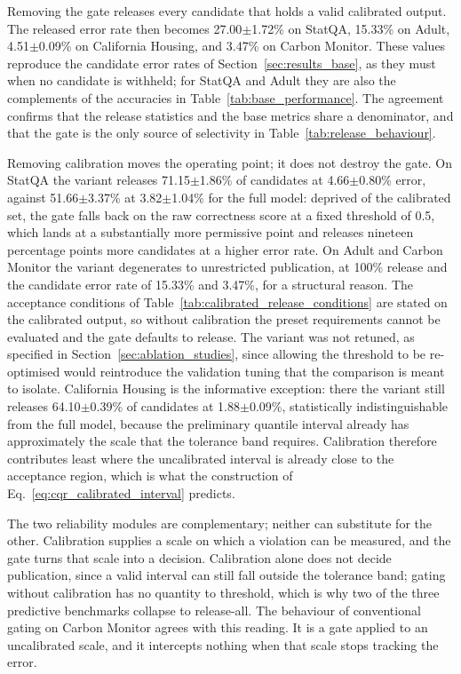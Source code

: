 \documentclass[preprint,12pt,authoryear]{elsarticle}
\begin{document}
Removing the gate releases every candidate that holds a valid calibrated output.
The released error rate then becomes 27.00$\pm$1.72\% on StatQA, 15.33\% on Adult, 4.51$\pm$0.09\% on California Housing, and 3.47\% on Carbon Monitor.
These values reproduce the candidate error rates of Section~\ref{sec:results_base}, as they must when no candidate is withheld; for StatQA and Adult they are also the complements of the accuracies in Table~\ref{tab:base_performance}.
The agreement confirms that the release statistics and the base metrics share a denominator, and that the gate is the only source of selectivity in Table~\ref{tab:release_behaviour}.

Removing calibration moves the operating point; it does not destroy the gate.
On StatQA the variant releases 71.15$\pm$1.86\% of candidates at 4.66$\pm$0.80\% error, against 51.66$\pm$3.37\% at 3.82$\pm$1.04\% for the full model: deprived of the calibrated set, the gate falls back on the raw correctness score at a fixed threshold of 0.5, which lands at a substantially more permissive point and releases nineteen percentage points more candidates at a higher error rate.
On Adult and Carbon Monitor the variant degenerates to unrestricted publication, at 100\% release and the candidate error rate of 15.33\% and 3.47\%, for a structural reason.
The acceptance conditions of Table~\ref{tab:calibrated_release_conditions} are stated on the calibrated output, so without calibration the preset requirements cannot be evaluated and the gate defaults to release.
The variant was not retuned, as specified in Section~\ref{sec:ablation_studies}, since allowing the threshold to be re-optimised would reintroduce the validation tuning that the comparison is meant to isolate.
California Housing is the informative exception: there the variant still releases 64.10$\pm$0.39\% of candidates at 1.88$\pm$0.09\%, statistically indistinguishable from the full model, because the preliminary quantile interval already has approximately the scale that the tolerance band requires.
Calibration therefore contributes least where the uncalibrated interval is already close to the acceptance region, which is what the construction of Eq.~\eqref{eq:cqr_calibrated_interval} predicts.

The two reliability modules are complementary; neither can substitute for the other.
Calibration supplies a scale on which a violation can be measured, and the gate turns that scale into a decision.
Calibration alone does not decide publication, since a valid interval can still fall outside the tolerance band; gating without calibration has no quantity to threshold, which is why two of the three predictive benchmarks collapse to release-all.
The behaviour of conventional gating on Carbon Monitor agrees with this reading. It is a gate applied to an uncalibrated scale, and it intercepts nothing when that scale stops tracking the error.
\end{document}
